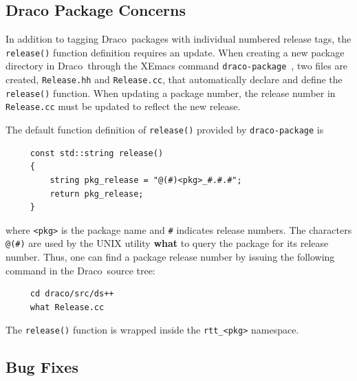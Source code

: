 \documentclass[11pt]{nmemo}
\newcommand{\draco}{{\normalfont\normalsize\sffamily Draco}}
\begin{document}
\subsection{Draco Package Concerns}

In addition to tagging \draco\ packages with individual numbered
release tags, the \texttt{release()} function definition requires an
update.  When creating a new package directory in \draco\ through the
XEmacs command \texttt{draco-package}~\cite{xtm:9909}, two files are
created, \texttt{Release.hh} and \texttt{Release.cc}, that
automatically declare and define the \texttt{release()} function.
When updating a package number, the release number in
\texttt{Release.cc} must be updated to reflect the new release.

The default function definition of \texttt{release()} provided by
\texttt{draco-package} is 
\begin{verbatim}
     const std::string release()
     {
         string pkg_release = "@(#)<pkg>_#.#.#";
         return pkg_release;      
     }
\end{verbatim}
where \texttt{<pkg>} is the package name and \texttt{\#} indicates
release numbers.  The characters \texttt{@(\#)} are used by the UNIX
utility {\bf what} to query the package for its release number.  Thus,
one can find a package release number by issuing the following command
in the \draco\ source tree:
\begin{verbatim}
     cd draco/src/ds++
     what Release.cc
\end{verbatim}
The \texttt{release()} function is wrapped inside the
\texttt{rtt\_<pkg>} namespace.

\subsection{Bug Fixes}
\end{document}
